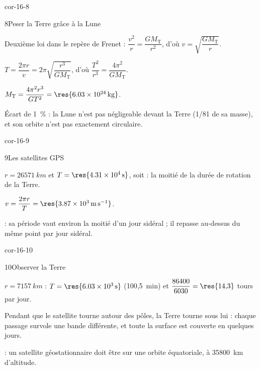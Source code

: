 \begin{blocLivre}{cor-16-8}
\begin{corrige}{8}{Peser la Terre grâce à la Lune}
\begin{questions}
\item Deuxième loi dans le repère de Frenet : $\dfrac{v^2}{r}=\dfrac{GM_\mathrm{T}}{r^2}$, d'où $v=\sqrt{\dfrac{GM_\mathrm{T}}{r}}$.
\item $T=\dfrac{2\pi r}{v}=2\pi\sqrt{\dfrac{r^3}{GM_\mathrm{T}}}$, d'où $\dfrac{T^2}{r^3}=\dfrac{4\pi^2}{GM_\mathrm{T}}$.
\item $M_\mathrm{T}=\dfrac{4\pi^2r^3}{GT^2}=\res{\qty{6,03e24}{kg}}$.
\item Écart de 1~\% : la Lune n'est pas négligeable devant la Terre (1/81 de sa masse), et son orbite n'est pas exactement
circulaire.
\end{questions}
\end{corrige}
\end{blocLivre}
\begin{blocLivre}{cor-16-9}
\begin{corrige}{9}{Les satellites GPS}
\begin{questions}
\item $r=\qty{26571}{km}$ et $T=\res{\qty{4,31e4}{s}}$, soit  : la moitié de la durée de rotation de la Terre.
\item $v=\dfrac{2\pi r}{T}=\res{\qty{3,87e3}{m.s^{-1}}}$.
\item {} : sa période vaut environ la moitié d'un jour sidéral ; il repasse au-dessus du même point
 par jour sidéral.
\end{questions}
\end{corrige}
\end{blocLivre}
\begin{blocLivre}{cor-16-10}
\begin{corrige}{10}{Observer la Terre}
\begin{questions}
\item $r=\qty{7157}{km}$ : $T=\res{\qty{6,03e3}{s}}$ (100,5~min) et $\dfrac{86400}{6030}=\res{14{,}3}$ tours par jour.
\item Pendant que le satellite tourne autour des pôles, la Terre tourne sous lui : chaque passage survole une bande
différente, et toute la surface est couverte en quelques jours.
\item {} : un satellite géostationnaire doit être sur une orbite équatoriale, à \num{35800}~km d'altitude.
\end{questions}
\end{corrige}
\end{blocLivre}
